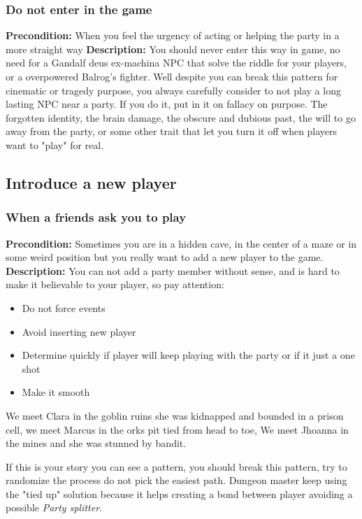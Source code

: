 \documentclass[letterpaper,10pt,twoside,twocolumn,openany]{book}
\begin{document}
\subsubsection{Do not enter in the game}
\textbf{Precondition:} When you feel the urgency of acting or helping the party in a more straight way
\newline
\noindent
\textbf{Description:} You should never enter this way in game, no need for a Gandalf deus ex-machina NPC that solve the riddle for your players, or a overpowered Balrog's fighter. Well despite you can break this pattern for cinematic or tragedy purpose, you always carefully consider to not play a long lasting NPC near a party. If you do it, put in it on fallacy on purpose.
The forgotten identity, the brain damage, the obscure and dubious past, the will to go away from the party, or some other trait that let you turn it off when players want to "play" for real.

\subsection{Introduce a new player}
\subsubsection{When a friends ask you to play}
\textbf{Precondition:} Sometimes you are in a hidden cave, in the center of a maze or in some weird position but you really want to add a new player to the game. 
\newline
\noindent
\textbf{Description:} You can not add a party member without sense, and is hard to make it believable to your player, so pay attention:
\begin{itemize}
\item Do not force events
\item Avoid inserting new player
\item Determine quickly if player will keep playing with the party or if it just a one shot
\item Make it smooth
\end{itemize}

\begin{quotebox}
	We meet Clara in the goblin ruins she was kidnapped and bounded in a prison cell, we meet Marcus in the orks pit tied from head to toe, We meet Jhoanna in the mines and she was stunned by bandit.
\end{quotebox}

If this is your story you can see a pattern, you should break this pattern, try to randomize the process do not pick the easiest path. Dungeon master keep using the "tied up" solution because it helps creating a bond between player avoiding a possible \textit{Party splitter}. 
\end{document}
